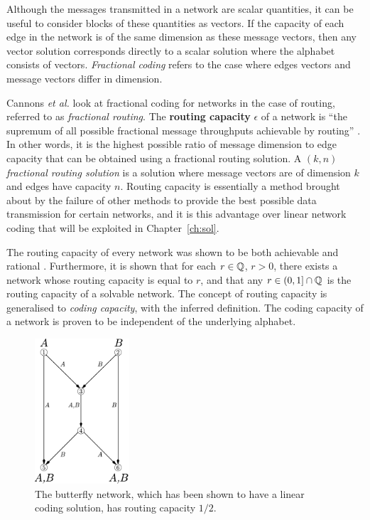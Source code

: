 Although the messages transmitted in a network are scalar quantities, it can be useful to consider blocks of these quantities as vectors. If the capacity of each edge in the network is of the same dimension as these message vectors, then any vector solution corresponds directly to a scalar solution where the alphabet consists of vectors. \emph{Fractional coding} refers to the case where edges vectors and message vectors differ in dimension.

Cannons \textit{et al.} \cite{cann2006} look at fractional coding for networks in the case of routing, referred to as \emph{fractional routing}. The \textbf{routing capacity} $\epsilon$ of a network is ``the supremum of all possible fractional message throughputs achievable by routing'' \cite{cann2006}. In other words, it is the highest possible ratio of message dimension to edge capacity that can be obtained using a fractional routing solution. A \emph{$(k, n)$ fractional routing solution} is a solution where message vectors are of dimension $k$ and edges have capacity $n$. Routing capacity is essentially a method brought about by the failure of other methods to provide the best possible data transmission for certain networks, and it is this advantage over linear network coding that will be exploited in Chapter~\ref{ch:sol}.

The routing capacity of every network was shown to be both achievable and rational \cite{cann2006}. Furthermore, it is shown that for each $r \in \mathbb{Q}$, $r > 0$, there exists a network whose routing capacity is equal to $r$, and that any $r \in (0, 1] \cap \mathbb{Q}$ is the routing capacity of a solvable network. The concept of routing capacity is generalised to \emph{coding capacity}, with the inferred definition. The coding capacity of a network is proven to be independent of the underlying alphabet.

\begin{figure}[ht]
	\centering
	\includegraphics[width=100pt]{figures/butterfly-routing.pdf}
	\caption[Routing capacity of the butterfly network]{The butterfly network, which has been shown to have a linear coding solution, has routing capacity $1/2$.}
	\label{butterfly-routing}
\end{figure}

